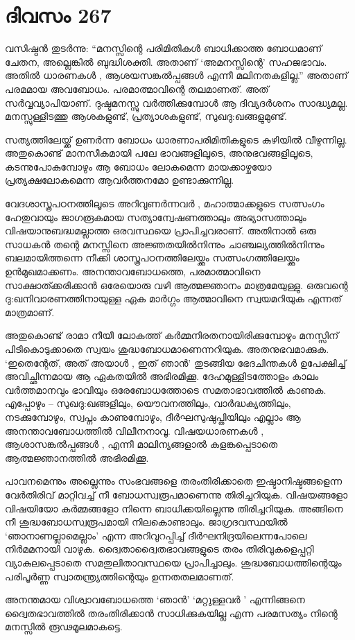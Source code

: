\section{ദിവസം 267}


വസിഷ്ഠന്‍ തുടര്‍ന്നു: “മനസ്സിന്റെ പരിമിതികള്‍ ബാധിക്കാത്ത ബോധമാണ് ചേതന, അല്ലെങ്കില്‍ ബുദ്ധിശക്തി. അതാണ്‌ ‘അമനസ്സിന്റെ’ സഹജഭാവം. അതില്‍ ധാരണകള്‍ , ആശയസങ്കല്‍പ്പങ്ങള്‍ എന്നീ മലിനതകളില്ല.” അതാണ്‌ പരമമായ അവബോധം. പരമാത്മാവിന്റെ തലമാണത്. അത് സര്‍വ്വവ്യാപിയാണ്. ദുഷ്ടമനസ്സു വര്‍ത്തിക്കുമ്പോള്‍ ആ ദിവ്യദര്‍ശനം സാദ്ധ്യമല്ല. മനസ്സുള്ളിടത്തു ആശകളുണ്ട്, പ്രത്യാശകളുണ്ട്, സുഖദു:ഖങ്ങളുമുണ്ട്.      

സത്യത്തിലേയ്ക്ക് ഉണര്‍ന്ന ബോധം ധാരണാപരിമിതികളുടെ കുഴിയില്‍ വീഴുന്നില്ല. അതുകൊണ്ട് മാനസീകമായി പലേ ഭാവങ്ങളിലൂടെ, അനുഭവങ്ങളിലൂടെ, കടന്നുപോകുമ്പോഴും ആ ബോധം ലോകമെന്ന മായക്കാഴ്ചയോ  പ്രത്യക്ഷലോകമെന്ന ആവര്‍ത്തനമോ ഉണ്ടാക്കുന്നില്ല.

വേദശാസ്ത്രപഠനത്തിലൂടെ അറിവുണര്‍ന്നവര്‍ , മഹാത്മാക്കളുടെ സത്സംഗം ഹേതുവായും ജാഗരൂകമായ സത്യാന്വേഷണത്താലും അഭ്യാസത്താലും വിഷയാനുബദ്ധമല്ലാത്ത ഒരവസ്ഥയെ പ്രാപിച്ചവരാണ്. അതിനാല്‍ ഒരു സാധകന്‍ തന്റെ മനസ്സിനെ അജ്ഞതയില്‍നിന്നും ചാഞ്ചല്യത്തില്‍നിന്നും ബലമായിത്തന്നെ നീക്കി ശാസ്ത്രപഠനത്തിലേയ്ക്കും സത്സംഗത്തിലേയ്ക്കും ഉന്‍മുഖമാക്കണം. അനന്താവബോധത്തെ, പരമാത്മാവിനെ സാക്ഷാത്ക്കരിക്കാന്‍ ഒരേയൊരു വഴി ആത്മജ്ഞാനം മാത്രമേയുള്ളു. ഒരുവന്റെ ദു:ഖനിവാരണത്തിനായുള്ള ഏക മാര്‍ഗ്ഗം ആത്മാവിനെ സ്വയമറിയുക എന്നത് മാത്രമാണ്.
        
അതുകൊണ്ട് രാമാ നീയീ ലോകത്ത് കര്‍മ്മനിരതനായിരിക്കുമ്പോഴും മനസ്സിന് പിടികൊടുക്കാതെ സ്വയം ശുദ്ധബോധമാണെന്നറിയുക. അതനുഭവമാക്കുക. ‘ഇതെന്റേത്, അത് അയാള്‍ , ഇത് ഞാന്‍’ തുടങ്ങിയ ഭേദചിന്തകള്‍ ഉപേക്ഷിച്ച് അവിച്ഛിന്നമായ ആ ഏകതയില്‍ അഭിരമിക്കൂ. ദേഹമുള്ളിടത്തോളം കാലം വര്‍ത്തമാനവും ഭാവിയും ഒരേബോധത്തോടെ സമതാഭാവത്തില്‍ കാണുക. എപ്പോഴും – സുഖദു:ഖങ്ങളിലും, യൌവനത്തിലും, വാര്‍ദ്ധക്യത്തിലും, നടക്കുമ്പോഴും, സ്വപ്നം കാണുമ്പോഴും, ദീര്‍ഘസുഷുപ്തിയിലും എല്ലാം ആ അനന്താവബോധത്തില്‍ വിലീനനാവൂ. വിഷയധാരണകള്‍ , ആശാസങ്കല്‍പ്പങ്ങള്‍ , എന്നീ മാലിന്യങ്ങളാല്‍ കളങ്കപ്പെടാതെ ആത്മജ്ഞാനത്തില്‍ അഭിരമിക്കൂ.
          
പാവനമെന്നും അല്ലെന്നും സംഭവങ്ങളെ തരംതിരിക്കാതെ ഇഷ്ടാനിഷ്ടങ്ങളെന്ന വേര്‍തിരിവ് മാറ്റിവച്ച് നീ ബോധസ്വരൂപമാണെന്നു തിരിച്ചറിയുക. വിഷയങ്ങളോ വിഷയിയോ കര്‍മ്മങ്ങളോ നിന്നെ ബാധിക്കയില്ലെന്നു തിരിച്ചറിയുക. അങ്ങിനെ നീ ശുദ്ധബോധസ്വരൂപമായി നിലകൊണ്ടാലും.  ജാഗ്രദവസ്ഥയില്‍ ‘ഞാനാണല്ലാമെല്ലാം’ എന്ന അറിവുറപ്പിച്ച് ദീര്‍ഘനിദ്രയിലെന്നപോലെ നിര്‍മമനായി വാഴുക. ദ്വൈതാദ്വൈതഭാവങ്ങളുടെ തരം തിരിവുകളെപ്പറ്റി വ്യാകുലപ്പെടാതെ സമതുലിതാവസ്ഥയെ പ്രാപിച്ചാലും. ശുദ്ധബോധത്തിന്റെയും പരിപൂര്‍ണ്ണ സ്വാതന്ത്ര്യത്തിന്റെയും ഉന്നതതലമാണത്.

അനന്തമായ വിശ്വാവബോധത്തെ ‘ഞാന്‍’ ‘മറ്റുള്ളവര്‍ ’ എന്നിങ്ങനെ ദ്വൈതഭാവത്തില്‍ തരംതിരിക്കാന്‍ സാധിക്കുകയില്ല എന്ന പരമസത്യം നിന്റെ മനസ്സില്‍ രൂഢമൂലമാകട്ടെ.